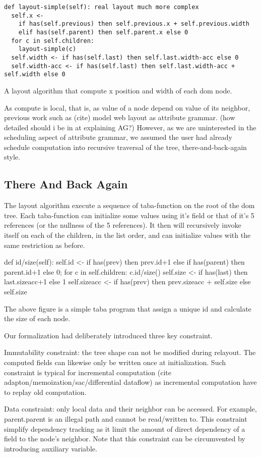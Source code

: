 \documentclass[format=acmsmall, review=false, screen=true]{acmart}
\begin{document}
\begin{verbatim}
def layout-simple(self): real layout much more complex
  self.x <-
    if has(self.previous) then self.previous.x + self.previous.width
    elif has(self.parent) then self.parent.x else 0
  for c in self.children:
    layout-simple(c)
  self.width <- if has(self.last) then self.last.width-acc else 0
  self.width-acc <- if has(self.last) then self.last.width-acc + self.width else 0
\end{verbatim}
A layout algorithm that compute x position and width of each dom node.

As compute is local, that is, as value of a node depend on value of its neighbor, previous work such as (cite) model web layout as attribute grammar. (how detailed should i be in at explaining AG?) However, as we are uninterested in the scheduling aspect of attribute grammar, we assumed the user had already schedule computation into recursive traversal of the tree, there-and-back-again style.

\subsection{There And Back Again}
The layout algorithm execute a sequence of taba-function on the root of the dom tree. Each taba-function can initialize some values using it's field or that of it's 5 references (or the nullness of the 5 references). It then will recursively invoke itself on each of the children, in the list order, and can initialize values with the same restriction as before.

def id/size(self):
self.id <-
if has(prev) then prev.id+1
else if has(parent) then parent.id+1
else 0;
for c in self.children:
c.id/size()
self.size <-
if has(last) then last.sizeacc+1
else 1
self.sizeacc <-
if has(prev) then prev.sizeacc + self.size
else self.size

The above figure is a simple taba program that assign a unique id and calculate the size of each node.

Our formalization had deliberately introduced three key constraint.

Immutability constraint: the tree shape can not be modified during relayout. The computed fields can likewise only be written once at initialization. Such constraint is typical for incremental computation (cite adapton/memoization/sac/differential dataflow) as incremental computation have to replay old computation. 

Data constraint: only local data and their neighbor can be accessed. For example, parent.parent is an illegal path and cannot be read/written to. This constraint simplify dependency tracking as it limit the amount of direct dependency of a field to the node's neighbor. Note that this constraint can be circumvented by introducing auxiliary variable.
\end{document}
